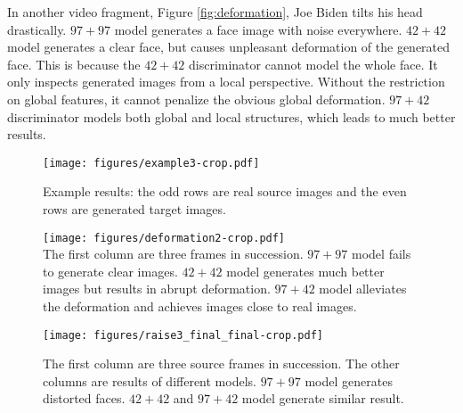 \documentclass[letterpaper]{article} %
\newcommand{\zhiming}[1]{{\bf \color{blue} [Zhiming says: #1]}}
\begin{document}
	In another video fragment, Figure \ref{fig:deformation}, Joe Biden tilts his head drastically. $97+97$ model generates a face image with noise everywhere. $42+42$ model generates a clear face, but causes unpleasant deformation of the generated face. This is because the $42+42$ discriminator cannot model the whole face. It only inspects generated images from a local perspective. Without the restriction on global features, it cannot penalize the obvious global deformation. $97+42$ discriminator models both global and local structures, which leads to much better results.
	
	\begin{figure*}[t]
		\centering
		\vspace{0pt}
		\texttt{[image: figures/example3-crop.pdf]}\\
		\caption{%
			Example results: the odd rows are real source images and the even rows are generated target images.} \label{fig:example}
		\vspace{0pt}	
	\end{figure*}
	
	\begin{figure*}  
		\vspace{-0pt}
		\begin{minipage}[t]{0.5\linewidth}  
			\centering
			\vspace{2pt}
			\texttt{[image: figures/deformation2-crop.pdf]}\\
			\caption{The first column are three frames in succession. $97+97$ model fails to generate clear images. $42+42$ model generates much better images but results in abrupt deformation. $97+42$ model alleviates the deformation and achieves images close to real images.} 
			\label{fig:deformation}
		\end{minipage}%
		\hspace{10pt}
		\begin{minipage}[t]{0.5\linewidth}  
			\centering
			\vspace{1.6pt}
			\texttt{[image: figures/raise3\_final\_final-crop.pdf]}\\
			\caption{The first column are three source frames in succession. The other columns are results of different models. $97+97$ model generates distorted faces. $42+42$ and $97+42$ model generate similar result. } \label{fig:raise}
			\vspace{0pt}
		\end{minipage}  
		\vspace{0pt}
	\end{figure*}  
	
\end{document}
